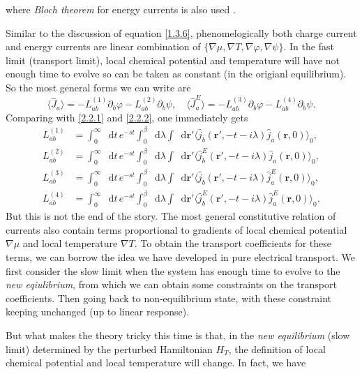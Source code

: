 \documentclass[10pt,nofootinbib,letterpaper]{revtex4}
\newcommand*\dd{\mathop{}\!\mathrm{d}}
\begin{document}
		where \emph{Bloch theorem} for energy currents is also used \cite{kapustin2019absence}.\par
		Similar to the discussion of equation \eqref{1.3.6}, phenomelogically both charge current and energy currents are linear combination of $\{\nabla\mu,\nabla T,\nabla\varphi,\nabla\psi\}$. In the fast limit (transport limit), local chemical potential and temperature will have not enough time to evolve so can be taken as constant (in the origianl equilibrium). So the most general forms we can write are
		\begin{equation}\label{2.2.3}
			\langle\hat J_a\rangle=-L_{ab}^{(1)}\partial_b\varphi-L^{(2)}_{ab}\partial_b\psi,\quad\langle\hat J_a^E\rangle=-L^{(3)}_{ab}\partial_b\varphi-L^{(4)}_{ab}\partial_b\psi.
		\end{equation}
		Comparing with \eqref{2.2.1} and \eqref{2.2.2}, one immediately gets
		\begin{align*}
			L_{ab}^{(1)}&=\int_0^\infty\dd t\,e^{-st}\int_0^\beta\dd\lambda\int\dd\bm{r'}\langle\hat j_b(\bm{r'},-t-i\lambda)\hat j_a(\bm{r},0)\rangle_0,\\
			L_{ab}^{(2)}&=\int_0^\infty\dd t\,e^{-st}\int_0^\beta\dd\lambda\int\dd\bm{r'}\langle\hat j_b^E(\bm{r'},-t-i\lambda)\hat j_a(\bm{r},0)\rangle_0,\\
			L_{ab}^{(3)}&=\int_0^\infty\dd t\,e^{-st}\int_0^\beta\dd\lambda\int\dd\bm{r'}\langle\hat j_b(\bm{r'},-t-i\lambda)\hat j_a^E(\bm{r},0)\rangle_0,\\
			L_{ab}^{(4)}&=\int_0^\infty\dd t\,e^{-st}\int_0^\beta\dd\lambda\int\dd\bm{r'}\langle\hat j_b^E(\bm{r'},-t-i\lambda)\hat j_a^E(\bm{r},0)\rangle_0.
		\end{align*}
		\indent But this is not the end of the story. The most general constitutive relation of currents also contain terms proportional to gradients of local chemical potential $\nabla\mu$ and local temperature $\nabla T$. To obtain the transport coefficients for these terms, we can borrow the idea we have developed in pure electrical transport. {\color{red}We first consider the slow limit when the system has enough time to evolve to the \emph{new eqiulibrium}, from which we can obtain some constraints on the transport coefficients. Then going back to non-equilibrium state, with these constraint keeping unchanged (up to linear response)}.\par
		But what makes the theory tricky this time is that, in the \emph{new equilibrium} (slow limit) determined by the perturbed Hamiltonian $H_T$, the definition of local chemical potential and local temperature will change. In fact, we have
\end{document}
